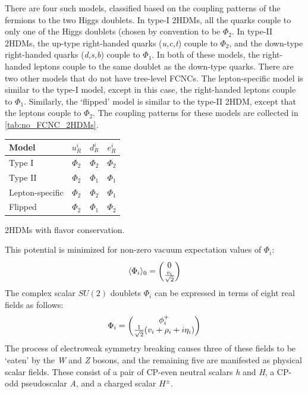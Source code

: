 There are four such models, classified based on the coupling patterns of the fermions to the two Higgs doublets. In type-I 2HDMs, all the quarks couple to only one of the Higgs doublets (chosen by convention to be $\Phi_2$. In type-II 2HDMs, the up-type right-handed quarks (\emph{u,c,t}) couple to $\Phi_2$, and the down-type right-handed quarks (\emph{d,s,b}) couple to $\Phi_1$. In both of these models, the right-handed leptons couple to the same doublet as the down-type quarks. There are two other models that do not have tree-level FCNCs. The lepton-specific model is similar to the type-I model, except in this case, the right-handed leptons couple to $\Phi_1$. Similarly, the `flipped' model is similar to the type-II 2HDM, except that the leptons couple to $\Phi_2$. The coupling patterns for these models are collected in \autoref{tab:no_FCNC_2HDMs}.

\begin{margintable}
\small{
  \begin{tabular}{lccc}
	\toprule
    Model & $u_R^i$ & $d_R^i$  & $e_R^i$\\
    \midrule
    Type I          & $\Phi_2$ & $\Phi_2$ & $\Phi_2$\\
    Type II         & $\Phi_2$ & $\Phi_1$ & $\Phi_1$\\
    Lepton-specific & $\Phi_2$ & $\Phi_2$ & $\Phi_1$\\
    Flipped         & $\Phi_2$ & $\Phi_1$ & $\Phi_2$\\
    \bottomrule
  \end{tabular}}
  \caption{2HDMs with flavor conservation.}
  \label{tab:no_FCNC_2HDMs}
\end{margintable}

This potential is minimized for non-zero vacuum expectation values of $\Phi_i$:
\begin{align}
\langle\Phi_i\rangle_0=\begin{pmatrix} 0 \\ \frac{v_i}{\sqrt{2}}\end{pmatrix}
\end{align}
The complex scalar $SU(2)$ doublets $\Phi_i$ can be expressed in terms of eight real fields as follows:
\begin{equation}\label{eq:2HDM_doublet_components}
\Phi_i = \begin{pmatrix} \phi_i^+ \\ \frac{1}{\sqrt{2}}(v_i+\rho_i+i\eta_i)\end{pmatrix}
\end{equation}
The process of electroweak symmetry breaking causes three of these fields to be `eaten' by the \emph{W} and \emph{Z} bosons, and the remaining five are manifested as physical scalar fields. These consist of a pair of CP-even neutral scalars \emph{h} and \emph{H}, a CP-odd pseudoscalar \emph{A}, and a charged scalar $H^\pm$.

